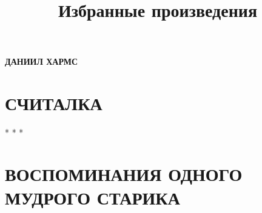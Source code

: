 \documentclass[12pt]{extarticle}
\title{Избранные произведения}
\begin{document}
\begin{center}
{\LARGE\textbf{ДАНИИЛ ХАРМС}}
\end{center}

\vspace{0.7cm}

\section{СЧИТАЛКА}


\begin{center}
* * *
\end{center}

\section{ВОСПОМИНАНИЯ ОДНОГО \\ МУДРОГО СТАРИКА}
\vspace{1cm}

\end{document}
